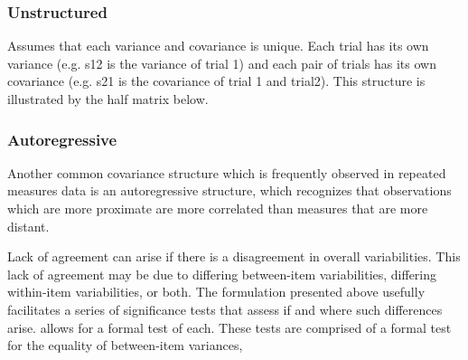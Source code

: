 \documentclass[12pt, a4paper]{report}
\theoremstyle{plain}
\theoremstyle{definition}
\theoremstyle{remark}
\begin{document}
		
		
		\subsubsection{Unstructured}
		
		Assumes that each variance and covariance is unique.
		Each trial has its own variance (e.g. s12 is the variance of trial 1)
		and each pair of trials has its own covariance (e.g. s21 is the covariance of trial 1 and trial2).
		This structure is illustrated by the half matrix below.
		
\subsubsection{Autoregressive}
		
Another common covariance structure which is frequently observed
in repeated measures data is an autoregressive structure,
which recognizes that observations which are more proximate
are more correlated than measures that are more distant.
			

	
	
	
	\newpage		
Lack of agreement can arise if there is a disagreement in overall variabilities. This lack of agreement may be due to differing between-item variabilities, differing within-item variabilities, or both. The formulation presented above usefully facilitates a series of significance tests that assess if and where such differences arise. \citet{ARoy2009} allows for a formal test of each. These tests are comprised of a formal test for the equality of between-item variances,
	
\end{document}
